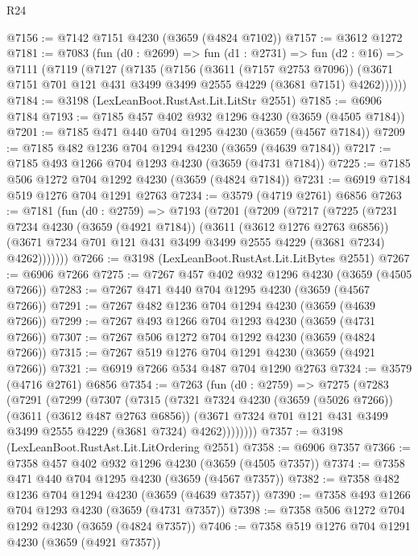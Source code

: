 \begin{lexlean}{R24}
\begin{coremodule}
@7156 := @7142 @7151 @4230 (@3659 (@4824 @7102))
@7157 := @3612 @1272
@7181 := @7083
    (fun (d0 : @2699) =>
    fun (d1 : @2731) =>
    fun (d2 : @16) =>
    @7111
      (@7119
        (@7127
          (@7135
            (@7156
              (@3611 (@7157 @2753 @7096))
              (@3671 @7151 @701 @121 @431 @3499 @3499 @2555 @4229 (@3681 @7151) @4262))))))
@7184 := @3198 (LexLeanBoot.RustAst.Lit.LitStr @2551)
@7185 := @6906 @7184
@7193 := @7185 @457 @402 @932 @1296 @4230 (@3659 (@4505 @7184))
@7201 := @7185 @471 @440 @704 @1295 @4230 (@3659 (@4567 @7184))
@7209 := @7185 @482 @1236 @704 @1294 @4230 (@3659 (@4639 @7184))
@7217 := @7185 @493 @1266 @704 @1293 @4230 (@3659 (@4731 @7184))
@7225 := @7185 @506 @1272 @704 @1292 @4230 (@3659 (@4824 @7184))
@7231 := @6919 @7184 @519 @1276 @704 @1291 @2763
@7234 := @3579 (@4719 @2761) @6856
@7263 := @7181
    (fun (d0 : @2759) =>
    @7193
      (@7201
        (@7209
          (@7217
            (@7225
              (@7231
                @7234
                @4230
                (@3659 (@4921 @7184))
                (@3611 (@3612 @1276 @2763 @6856))
                (@3671 @7234 @701 @121 @431 @3499 @3499 @2555 @4229 (@3681 @7234) @4262)))))))
@7266 := @3198 (LexLeanBoot.RustAst.Lit.LitBytes @2551)
@7267 := @6906 @7266
@7275 := @7267 @457 @402 @932 @1296 @4230 (@3659 (@4505 @7266))
@7283 := @7267 @471 @440 @704 @1295 @4230 (@3659 (@4567 @7266))
@7291 := @7267 @482 @1236 @704 @1294 @4230 (@3659 (@4639 @7266))
@7299 := @7267 @493 @1266 @704 @1293 @4230 (@3659 (@4731 @7266))
@7307 := @7267 @506 @1272 @704 @1292 @4230 (@3659 (@4824 @7266))
@7315 := @7267 @519 @1276 @704 @1291 @4230 (@3659 (@4921 @7266))
@7321 := @6919 @7266 @534 @487 @704 @1290 @2763
@7324 := @3579 (@4716 @2761) @6856
@7354 := @7263
    (fun (d0 : @2759) =>
    @7275
      (@7283
        (@7291
          (@7299
            (@7307
              (@7315
                (@7321
                  @7324
                  @4230
                  (@3659 (@5026 @7266))
                  (@3611 (@3612 @487 @2763 @6856))
                  (@3671 @7324 @701 @121 @431 @3499 @3499 @2555 @4229 (@3681 @7324) @4262))))))))
@7357 := @3198 (LexLeanBoot.RustAst.Lit.LitOrdering @2551)
@7358 := @6906 @7357
@7366 := @7358 @457 @402 @932 @1296 @4230 (@3659 (@4505 @7357))
@7374 := @7358 @471 @440 @704 @1295 @4230 (@3659 (@4567 @7357))
@7382 := @7358 @482 @1236 @704 @1294 @4230 (@3659 (@4639 @7357))
@7390 := @7358 @493 @1266 @704 @1293 @4230 (@3659 (@4731 @7357))
@7398 := @7358 @506 @1272 @704 @1292 @4230 (@3659 (@4824 @7357))
@7406 := @7358 @519 @1276 @704 @1291 @4230 (@3659 (@4921 @7357))

\end{coremodule}
\end{lexlean}
